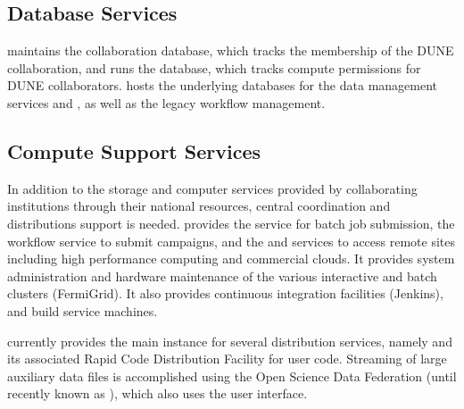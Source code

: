 \documentclass[../main-v1.tex]{subfiles}
\begin{document}
\subsection{Database Services}
 maintains the collaboration database, which tracks the membership of the DUNE collaboration, and runs the  
database, which tracks compute permissions for DUNE collaborators.   hosts the underlying databases for the data management
services  and , as well as the legacy  workflow management. %


\subsection{Compute Support Services}
In addition to the storage and computer services provided by collaborating institutions through their national resources, central coordination and distributions support is needed. 
 provides the  service for batch job submission, the  workflow service to submit campaigns, and the 
and  services to access remote sites including high performance computing and commercial clouds. It provides system administration and hardware maintenance of the various interactive and batch clusters (FermiGrid).  It also provides
continuous integration facilities (Jenkins), and build service machines.  


 currently provides the main instance for several distribution services, namely  and its associated Rapid Code Distribution Facility for user code.  Streaming of large auxiliary data files is accomplished using the Open Science Data Federation (until recently known as 
), which also uses the  user interface. 

\end{document}

